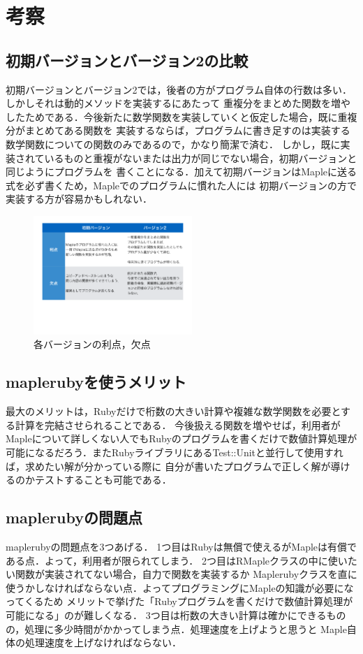 \section{考察}
\subsection{初期バージョンとバージョン2の比較}
初期バージョンとバージョン2では，後者の方がプログラム自体の行数は多い．しかしそれは動的メソッドを実装するにあたって
重複分をまとめた関数を増やしたためである．今後新たに数学関数を実装していくと仮定した場合，既に重複分がまとめてある関数を
実装するならば，プログラムに書き足すのは実装する数学関数についての関数のみであるので，かなり簡潔で済む．
しかし，既に実装されているものと重複がないまたは出力が同じでない場合，初期バージョンと同じようにプログラムを
書くことになる．加えて初期バージョンはMapleに送る式を必ず書くため，Mapleでのプログラムに慣れた人には
初期バージョンの方で実装する方が容易かもしれない．

\begin{figure}[htbp]\begin{center}
\includegraphics[width=6cm,bb=0 0 442 500]{../figs/./mapleruby_eringi.009.png}
\caption{各バージョンの利点，欠点}
\label{default}\end{center}\end{figure}
\subsection{maplerubyを使うメリット}
最大のメリットは，Rubyだけで桁数の大きい計算や複雑な数学関数を必要とする計算を完結させられることである．
今後扱える関数を増やせば，利用者がMapleについて詳しくない人でもRubyのプログラムを書くだけで数値計算処理が
可能になるだろう．またRubyライブラリにあるTest::Unitと並行して使用すれば，求めたい解が分かっている際に
自分が書いたプログラムで正しく解が導けるのかテストすることも可能である．

\subsection{maplerubyの問題点}
maplerubyの問題点を3つあげる．
1つ目はRubyは無償で使えるがMapleは有償である点．よって，利用者が限られてしまう．
2つ目はRMapleクラスの中に使いたい関数が実装されてない場合，自力で関数を実装するか
Maplerubyクラスを直に使うかしなければならない点．よってプログラミングにMapleの知識が必要になってくるため
メリットで挙げた「Rubyプログラムを書くだけで数値計算処理が可能になる」のが難しくなる．
3つ目は桁数の大きい計算は確かにできるものの，処理に多少時間がかかってしまう点．処理速度を上げようと思うと
Maple自体の処理速度を上げなければならない．

